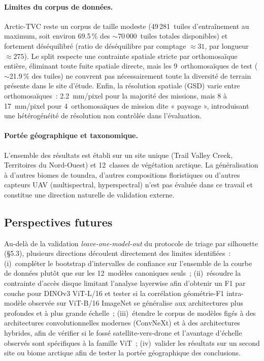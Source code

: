 \documentclass[11pt,a4paper]{article}
\begin{document}
\paragraph{Limites du corpus de données.} Arctic-TVC reste un corpus de taille modeste (49\,281~tuiles d'entraînement au maximum, soit environ 69.5\,\% des $\sim$70\,000~tuiles totales disponibles) et fortement déséquilibré (ratio de déséquilibre par comptage $\approx31$, par longueur $\approx275$). Le split respecte une contrainte spatiale stricte par orthomosaïque entière, éliminant toute fuite spatiale directe, mais les 9~orthomosaïques de test ($\sim$21.9\,\% des tuiles) ne couvrent pas nécessairement toute la diversité de terrain présente dans le site d'étude. Enfin, la résolution spatiale (GSD) varie entre orthomosaïques~: 2.2~mm/pixel pour la majorité des missions, mais 8 à 17~mm/pixel pour 4~orthomosaïques de mission dite « paysage », introduisant une hétérogénéité de résolution non contrôlée dans l'évaluation.

\paragraph{Portée géographique et taxonomique.} L'ensemble des résultats est établi sur un site unique (Trail Valley Creek, Territoires du Nord-Ouest) et 12~classes de végétation arctique. La généralisation à d'autres biomes de toundra, d'autres compositions floristiques ou d'autres capteurs UAV (multispectral, hyperspectral) n'est pas évaluée dans ce travail et constitue une direction naturelle de validation externe.

\subsection{Perspectives futures}

Au-delà de la validation \emph{leave-one-model-out} du protocole de triage par silhouette (\S5.3), plusieurs directions découlent directement des limites identifiées~: (i)~compléter le bootstrap d'intervalles de confiance sur l'ensemble de la courbe de données plutôt que sur les 12~modèles canoniques seuls~; (ii)~résoudre la contrainte d'accès disque limitant l'analyse layerwise afin d'obtenir un F1 par couche pour DINOv3 ViT-L/16 et tester si la corrélation géométrie-F1 intra-modèle observée sur ViT-B/16 ImageNet se généralise aux architectures plus profondes et à plus grande échelle~; (iii)~étendre le corpus de modèles figés à des architectures convolutionnelles modernes (ConvNeXt) et à des architectures hybrides, afin de vérifier si le fossé satellite-vers-drone et l'avantage d'échelle observés sont spécifiques à la famille ViT~; (iv)~valider les résultats sur un second site ou biome arctique afin de tester la portée géographique des conclusions.
\end{document}
